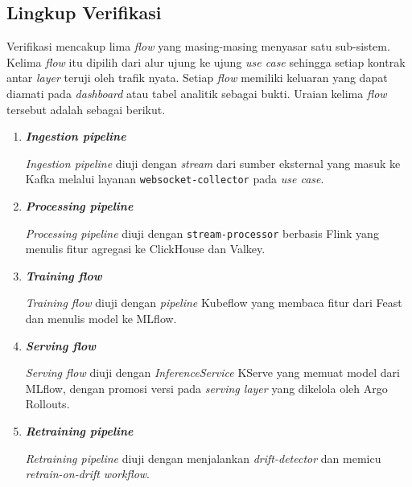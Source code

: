 \subsection{Lingkup Verifikasi}
\label{subsec:lingkup-verifikasi}

Verifikasi mencakup lima \textit{flow} yang masing-masing menyasar satu sub-sistem. Kelima \textit{flow} itu dipilih dari alur ujung ke ujung \textit{use case} sehingga setiap kontrak antar \textit{layer} teruji oleh trafik nyata. Setiap \textit{flow} memiliki keluaran yang dapat diamati pada \textit{dashboard} atau tabel analitik sebagai bukti. Uraian kelima \textit{flow} tersebut adalah sebagai berikut.

\vspace{0.5em}
\begin{enumerate}
    \item \textbf{\textit{Ingestion pipeline}}

    \textit{Ingestion pipeline} diuji dengan \textit{stream} dari sumber eksternal yang masuk ke Kafka melalui layanan \texttt{websocket-collector} pada \textit{use case}.

    \vspace{0.5em}

    \item \textbf{\textit{Processing pipeline}}

    \textit{Processing pipeline} diuji dengan \texttt{stream-processor} berbasis Flink yang menulis fitur agregasi ke ClickHouse dan Valkey.

    \vspace{0.5em}

    \item \textbf{\textit{Training flow}}

    \textit{Training flow} diuji dengan \textit{pipeline} Kubeflow yang membaca fitur dari Feast dan menulis model ke MLflow.

    \vspace{0.5em}

    \item \textbf{\textit{Serving flow}}

    \textit{Serving flow} diuji dengan \textit{InferenceService} KServe yang memuat model dari MLflow, dengan promosi versi pada \textit{serving layer} yang dikelola oleh Argo Rollouts.

    \vspace{0.5em}

    \item \textbf{\textit{Retraining pipeline}}

    \textit{Retraining pipeline} diuji dengan menjalankan \textit{drift-detector} dan memicu \textit{retrain-on-drift} \textit{workflow}.
\end{enumerate}

